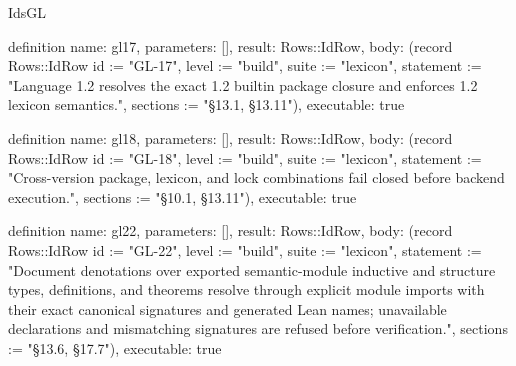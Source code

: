 \begin{lexlean}{IdsGL}
\begin{semanticmodule}
definition{
  name: gl17,
  parameters: [],
  result: Rows::IdRow,
  body: (record Rows::IdRow {id := "GL-17", level := "build", suite := "lexicon", statement := "Language 1.2 resolves the exact 1.2 builtin package closure and enforces 1.2 lexicon semantics.", sections := "§13.1, §13.11"}),
  executable: true
}

definition{
  name: gl18,
  parameters: [],
  result: Rows::IdRow,
  body: (record Rows::IdRow {id := "GL-18", level := "build", suite := "lexicon", statement := "Cross-version package, lexicon, and lock combinations fail closed before backend execution.", sections := "§10.1, §13.11"}),
  executable: true
}

definition{
  name: gl22,
  parameters: [],
  result: Rows::IdRow,
  body: (record Rows::IdRow {id := "GL-22", level := "build", suite := "lexicon", statement := "Document denotations over exported semantic-module inductive and structure types, definitions, and theorems resolve through explicit module imports with their exact canonical signatures and generated Lean names; unavailable declarations and mismatching signatures are refused before verification.", sections := "§13.6, §17.7"}),
  executable: true
}
\end{semanticmodule}
\end{lexlean}
